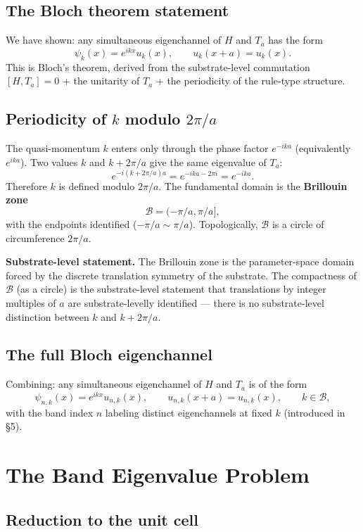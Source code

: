\documentclass[11pt,a4paper]{article}
\begin{document}
\subsection{The Bloch theorem statement}

We have shown: any simultaneous eigenchannel of $H$ and $T_a$ has the form
\[
\psi_k(x) = e^{ikx} u_k(x), \qquad u_k(x + a) = u_k(x).
\]
This is Bloch's theorem, derived from the substrate-level commutation $[H, T_a] = 0$ + the unitarity of $T_a$ + the periodicity of the rule-type structure.

\subsection{Periodicity of $k$ modulo $2\pi/a$}

The quasi-momentum $k$ enters only through the phase factor $e^{-ika}$ (equivalently $e^{ika}$). Two values $k$ and $k + 2\pi/a$ give the same eigenvalue of $T_a$:
\[
e^{-i(k + 2\pi/a)a} = e^{-ika - 2\pi i} = e^{-ika}.
\]
Therefore $k$ is defined modulo $2\pi/a$. The fundamental domain is the \textbf{Brillouin zone}
\[
\mathcal{B} = (-\pi/a, \pi/a],
\]
with the endpoints identified ($-\pi/a \sim \pi/a$). Topologically, $\mathcal{B}$ is a circle of circumference $2\pi/a$.

\textbf{Substrate-level statement.} The Brillouin zone is the parameter-space domain forced by the discrete translation symmetry of the substrate. The compactness of $\mathcal{B}$ (as a circle) is the substrate-level statement that translations by integer multiples of $a$ are substrate-levelly identified --- there is no substrate-level distinction between $k$ and $k + 2\pi/a$.

\subsection{The full Bloch eigenchannel}

Combining: any simultaneous eigenchannel of $H$ and $T_a$ is of the form
\[
\psi_{n,k}(x) = e^{ikx} u_{n,k}(x), \qquad u_{n,k}(x + a) = u_{n,k}(x), \qquad k \in \mathcal{B},
\]
with the band index $n$ labeling distinct eigenchannels at fixed $k$ (introduced in \S5).

\section{The Band Eigenvalue Problem}

\subsection{Reduction to the unit cell}
\end{document}
